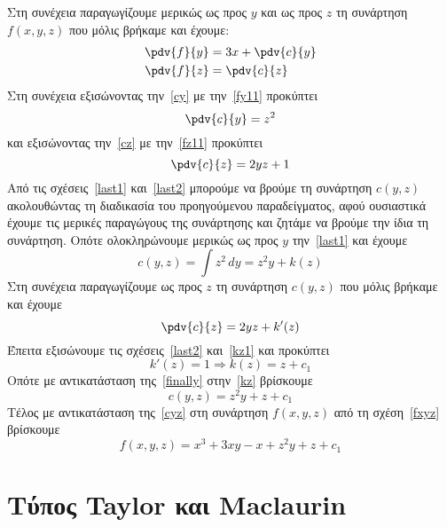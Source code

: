 \documentclass[a4paper,table]{report}
\begin{document}
\begin{solution}
\begin{description}
\begin{equation}
      \end{equation}
      Στη συνέχεια παραγωγίζουμε μερικώς ως προς $y$ και ως προς $z$  
      τη συνάρτηση $f(x,y,z)$ που μόλις βρήκαμε και έχουμε:
      \begin{align}
        \pdv{f}{y} &= 3x + \pdv{c}{y} \label{cy} \\
        \pdv{f}{z} &= \pdv{c}{z} \label{cz}
      \end{align}
      Στη συνέχεια εξισώνοντας την~\eqref{cy} με την~\eqref{fy11} προκύπτει 
      \begin{equation}
        \pdv{c}{y} = z^{2} \label{last1}
      \end{equation}
      και εξισώνοντας την~\eqref{cz} με την~\eqref{fz11} προκύπτει
      \begin{equation}
        \pdv{c}{z} = 2yz+1 \label{last2}
      \end{equation}
      Από τις σχέσεις~\eqref{last1} και~\eqref{last2} μπορούμε να βρούμε τη συνάρτηση 
      $ c(y,z) $ ακολουθώντας τη διαδικασία του προηγούμενου παραδείγματος, αφού 
      ουσιαστικά έχουμε τις μερικές παραγώγους της συνάρτησης και ζητάμε 
      να βρούμε την ίδια τη συνάρτηση. Οπότε ολοκληρώνουμε μερικώς ως προς 
      $y$ την~\eqref{last1} και έχουμε
      \begin{equation}
        c(y,z) = \int z^{2} \,{dy} = z^{2}y + k(z) \label{kz} 
      \end{equation} 
      Στη συνέχεια παραγωγίζουμε ως προς $z$ τη συνάρτηση $ c(y,z) $ που μόλις βρήκαμε 
      και έχουμε
      \begin{equation}
        \pdv{c}{z} = 2yz + k'(z) \label{kz1}
      \end{equation} 
      Έπειτα εξισώνουμε τις σχέσεις~\eqref{last2} και~\eqref{kz1} και προκύπτει 
      \[
        k'(z) = 1 \Rightarrow k(z) = z + c_{1} \label{finally}
      \] 
      Οπότε με αντικατάσταση της~\eqref{finally} στην~\eqref{kz} βρίσκουμε 
      \begin{equation}
        c(y,z) = z^{2}y+z + c_{1} \label{cyz}
      \end{equation}
      Τέλος με αντικατάσταση της~\eqref{cyz} στη συνάρτηση $ f(x,y,z) $ από τη 
      σχέση~\eqref{fxyz} βρίσκουμε
      \[
        f(x,y,z) = x^{3}+3xy-x+z^{2}y+z+ c_{1} 
      \] 
  \end{description}
\end{solution}




\chapter{Τύπος Taylor και Maclaurin}
\end{document}
